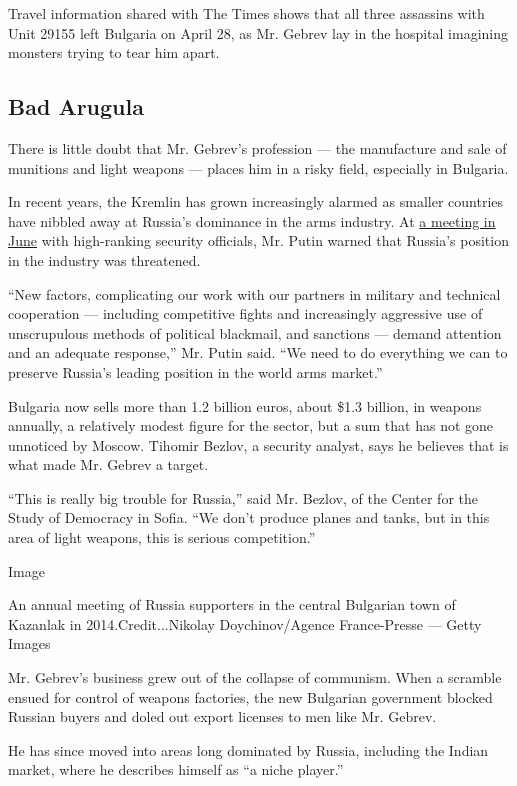 Travel information shared with The Times shows that all three assassins
with Unit 29155 left Bulgaria on April 28, as Mr. Gebrev lay in the
hospital imagining monsters trying to tear him apart.

\hypertarget{bad-arugula}{%
\subsection{Bad Arugula}\label{bad-arugula}}

There is little doubt that Mr. Gebrev's profession --- the manufacture
and sale of munitions and light weapons --- places him in a risky field,
especially in Bulgaria.

In recent years, the Kremlin has grown increasingly alarmed as smaller
countries have nibbled away at Russia's dominance in the arms industry.
At \href{http://kremlin.ru/events/president/news/60812}{a meeting in
June} with high-ranking security officials, Mr. Putin warned that
Russia's position in the industry was threatened.

``New factors, complicating our work with our partners in military and
technical cooperation --- including competitive fights and increasingly
aggressive use of unscrupulous methods of political blackmail, and
sanctions --- demand attention and an adequate response,'' Mr. Putin
said. ``We need to do everything we can to preserve Russia's leading
position in the world arms market.''

Bulgaria now sells more than 1.2 billion euros, about \$1.3 billion, in
weapons annually, a relatively modest figure for the sector, but a sum
that has not gone unnoticed by Moscow. Tihomir Bezlov, a security
analyst, says he believes that is what made Mr. Gebrev a target.

``This is really big trouble for Russia,'' said Mr. Bezlov, of the
Center for the Study of Democracy in Sofia. ``We don't produce planes
and tanks, but in this area of light weapons, this is serious
competition.''

Image

An annual meeting of Russia supporters in the central Bulgarian town of
Kazanlak in 2014.Credit...Nikolay Doychinov/Agence France-Presse ---
Getty Images

Mr. Gebrev's business grew out of the collapse of communism. When a
scramble ensued for control of weapons factories, the new Bulgarian
government blocked Russian buyers and doled out export licenses to men
like Mr. Gebrev.

He has since moved into areas long dominated by Russia, including the
Indian market, where he describes himself as ``a niche player.''

